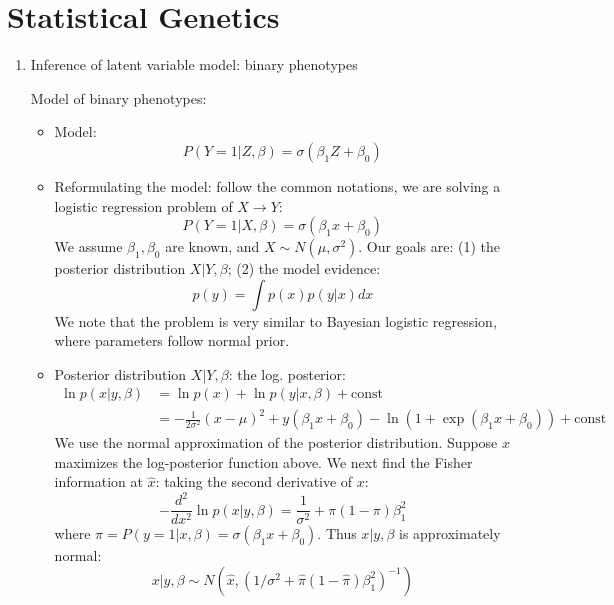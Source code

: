 \documentclass[11pt]{article}
\begin{document}
\section{Statistical Genetics}
\begin{enumerate}

\item{Inference of latent variable model: binary phenotypes}

Model of binary phenotypes: 
\begin{itemize}
\item Model: 
\begin{equation}
P(Y=1|Z,\beta) = \sigma(\beta_1 Z + \beta_0)
\end{equation}

\item Reformulating the model: follow the common notations, we are solving a logistic regression problem of $X \rightarrow Y$: 
\begin{equation}
P(Y=1|X,\beta) = \sigma(\beta_1 x + \beta_0)	
\end{equation}
We assume $\beta_1, \beta_0$ are known, and $X \sim N(\mu, \sigma^2)$. Our goals are: (1) the posterior distribution $X|Y,\beta$; (2) the model evidence: 
\begin{equation}
p(y) = \int p(x) p(y|x) dx	
\end{equation}
We note that the problem is very similar to Bayesian logistic regression, where parameters follow normal prior. 

\item Posterior distribution $X|Y,\beta$: the log. posterior: 
\begin{equation}
\begin{array}{ll}
\ln p(x|y,\beta) & = \ln p(x) + \ln p(y|x,\beta) + \text{const} \\
 & = -\frac{1}{2\sigma^2}(x-\mu)^2 + y(\beta_1 x + \beta_0) - \ln(1 + \exp(\beta_1 x + \beta_0)) + \text{const}
\end{array}
\end{equation}
We use the normal approximation of the posterior distribution. Suppose $\hat{x}$ maximizes the log-posterior function above. We next find the Fisher information at $\hat{x}$: taking the second derivative of $x$: 
\begin{equation}
- \frac{d^2}{dx^2} \ln p(x|y,\beta) = \frac{1}{\sigma^2} + \pi (1 - \pi) \beta_1^2	
\end{equation}
where $\pi = P(y=1|x,\beta) = \sigma(\beta_1 x + \beta_0)$. Thus $x|y,\beta$ is approximately normal:
\begin{equation}
x|y,\beta \sim N\left(\hat{x},(1/\sigma^2 + \hat{\pi}(1-\hat{\pi})\beta_1^2)^{-1}\right)	
\end{equation}


\end{itemize}
\end{enumerate}
\end{document}
